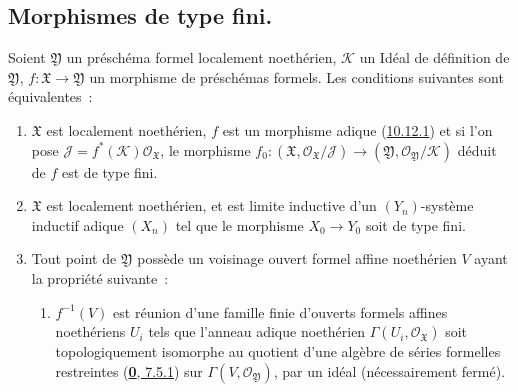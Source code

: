 \subsection{Morphismes de type fini.}
\label{subsection:I.10.13-fr}

\begin{proposition}[10.13.1]
\label{I.10.13.1-fr}
Soient $\mathfrak{Y}$ un préschéma formel localement noethérien,
$\mathscr{K}$ un Idéal de définition de $\mathfrak{Y}$,
$f:\mathfrak{X}\to\mathfrak{Y}$ un morphisme de préschémas formels. Les
conditions suivantes sont équivalentes~:
\begin{enumerate}
  \item[\textup{a)}] $\mathfrak{X}$ est localement noethérien, $f$ est un morphisme
    adique \textup{(\hyperref[I.10.12.1-fr]{10.12.1})} et si l'on pose
    $\mathscr{J}=f^*(\mathscr{K})\mathscr{O}_{\mathfrak{X}}$, le morphisme
    $f_0:(\mathfrak{X},\mathscr{O}_{\mathfrak{X}}/\mathscr{J})
    \to(\mathfrak{Y},\mathscr{O}_{\mathfrak{Y}}/\mathscr{K})$ déduit de
    $f$ est de type fini.
  \item[\textup{b)}] $\mathfrak{X}$ est localement noethérien, et est limite
    inductive d'un $(Y_n)$-système inductif adique $(X_n)$ tel que le
    morphisme $X_0\to Y_0$ soit de type fini.


  \item[\textup{c)}] Tout point de $\mathfrak{Y}$ possède un voisinage ouvert formel
    affine noethérien $V$ ayant la propriété suivante~:
    \begin{enumerate}
      \item[\textup{(Q)}] $f^{-1}(V)$ est réunion d'une famille finie
        d'ouverts formels affines noethériens $U_i$ tels que l'anneau adique
        noethérien $\Gamma(U_i,\mathscr{O}_{\mathfrak{X}})$ soit
        topologiquement isomorphe au quotient d'une algèbre de séries
        formelles restreintes \textup{(\hyperref[0.7.5.1-fr]{\textbf{0}, 7.5.1})} sur
        $\Gamma(V,\mathscr{O}_{\mathfrak{Y}})$, par un idéal (nécessairement
        fermé).
    \end{enumerate}
\end{enumerate}
\end{proposition}


